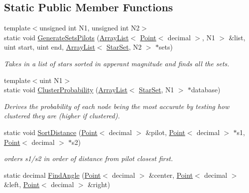 \subsection*{Static Public Member Functions}
\begin{DoxyCompactItemize}
\item 
{\footnotesize template$<$unsigned int N1, unsigned int N2$>$ }\\static void \hyperlink{classstar__tracker_1_1StarSet_a0a6eb926918ac3e40e916803b0e40bcf}{Generate\+Sets\+Pilots} (\hyperlink{classutil_1_1ArrayList}{Array\+List}$<$ \hyperlink{classutil_1_1Point}{Point}$<$ decimal $>$, N1 $>$ \&list, uint start, uint end, \hyperlink{classutil_1_1ArrayList}{Array\+List}$<$ \hyperlink{classstar__tracker_1_1StarSet}{Star\+Set}, N2 $>$ $\ast$sets)
\begin{DoxyCompactList}\small\item\em Takes in a list of stars sorted in apperant magnitude and finds all the sets. \end{DoxyCompactList}\item 
{\footnotesize template$<$uint N1$>$ }\\static void \hyperlink{classstar__tracker_1_1StarSet_ab7e82b5ae515ac6eb5d1ae03e1bb5480}{Cluster\+Probability} (\hyperlink{classutil_1_1ArrayList}{Array\+List}$<$ \hyperlink{classstar__tracker_1_1StarSet}{Star\+Set}, N1 $>$ $\ast$database)
\begin{DoxyCompactList}\small\item\em Derives the probability of each node being the most accurate by testing how clustered they are (higher if clustered). \end{DoxyCompactList}\item 
static void \hyperlink{classstar__tracker_1_1StarSet_a29b12bd3b22a9a500a45c90e18160c2e}{Sort\+Distance} (\hyperlink{classutil_1_1Point}{Point}$<$ decimal $>$ \&pilot, \hyperlink{classutil_1_1Point}{Point}$<$ decimal $>$ $\ast$s1, \hyperlink{classutil_1_1Point}{Point}$<$ decimal $>$ $\ast$s2)
\begin{DoxyCompactList}\small\item\em orders s1/s2 in order of distance from pilot closest first. \end{DoxyCompactList}\item 
static decimal \hyperlink{classstar__tracker_1_1StarSet_a8a3ae946238c5a4640d1c3eedf1c6307}{Find\+Angle} (\hyperlink{classutil_1_1Point}{Point}$<$ decimal $>$ \&center, \hyperlink{classutil_1_1Point}{Point}$<$ decimal $>$ \&left, \hyperlink{classutil_1_1Point}{Point}$<$ decimal $>$ \&right)

\end{DoxyCompactItemize}

